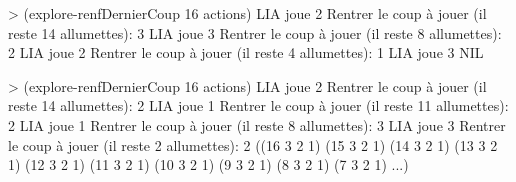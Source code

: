 \documentclass[
]{article}
\newenvironment{Shaded}{}{}
\newcommand{\DecValTok}[1]{\textcolor[rgb]{0.25,0.63,0.44}{#1}}
\newcommand{\NormalTok}[1]{#1}
\newcommand{\OperatorTok}[1]{\textcolor[rgb]{0.40,0.40,0.40}{#1}}
\begin{document}
\begin{Shaded}
    \begin{algorithm}[H]
\begin{Highlighting}[]
\OperatorTok{\textgreater{}}\NormalTok{ (explore{-}renfDernierCoup }\DecValTok{16}\NormalTok{ actions)}
\NormalTok{L\textquotesingle{}IA joue }\DecValTok{2} 
\NormalTok{Rentrer le coup à jouer (il reste }\DecValTok{14}\NormalTok{ allumettes): }
\DecValTok{3}
\NormalTok{L\textquotesingle{}IA joue }\DecValTok{3} 
\NormalTok{Rentrer le coup à jouer (il reste }\DecValTok{8}\NormalTok{ allumettes): }
\DecValTok{2}
\NormalTok{L\textquotesingle{}IA joue }\DecValTok{2} 
\NormalTok{Rentrer le coup à jouer (il reste }\DecValTok{4}\NormalTok{ allumettes): }
\DecValTok{1}
\NormalTok{L\textquotesingle{}IA joue }\DecValTok{3} 
\NormalTok{NIL}
\end{Highlighting}
\end{algorithm}
\end{Shaded}


\begin{Shaded}
    \begin{algorithm}[H]
    \begin{Highlighting}[]
\OperatorTok{\textgreater{}}\NormalTok{ (explore{-}renfDernierCoup }\DecValTok{16}\NormalTok{ actions)}
\NormalTok{L\textquotesingle{}IA joue }\DecValTok{2} 
\NormalTok{Rentrer le coup à jouer (il reste }\DecValTok{14}\NormalTok{ allumettes): }
\DecValTok{2}
\NormalTok{L\textquotesingle{}IA joue }\DecValTok{1} 
\NormalTok{Rentrer le coup à jouer (il reste }\DecValTok{11}\NormalTok{ allumettes): }
\DecValTok{2}
\NormalTok{L\textquotesingle{}IA joue }\DecValTok{1} 
\NormalTok{Rentrer le coup à jouer (il reste }\DecValTok{8}\NormalTok{ allumettes): }
\DecValTok{3}
\NormalTok{L\textquotesingle{}IA joue }\DecValTok{3} 
\NormalTok{Rentrer le coup à jouer (il reste }\DecValTok{2}\NormalTok{ allumettes): }
\DecValTok{2}
\NormalTok{((}\DecValTok{16} \DecValTok{3} \DecValTok{2} \DecValTok{1}\NormalTok{) (}\DecValTok{15} \DecValTok{3} \DecValTok{2} \DecValTok{1}\NormalTok{) (}\DecValTok{14} \DecValTok{3} \DecValTok{2} \DecValTok{1}\NormalTok{) (}\DecValTok{13} \DecValTok{3} \DecValTok{2} \DecValTok{1}\NormalTok{) (}\DecValTok{12} \DecValTok{3} \DecValTok{2} \DecValTok{1}\NormalTok{)}
\NormalTok{ (}\DecValTok{11} \DecValTok{3} \DecValTok{2} \DecValTok{1}\NormalTok{) (}\DecValTok{10} \DecValTok{3} \DecValTok{2} \DecValTok{1}\NormalTok{) (}\DecValTok{9} \DecValTok{3} \DecValTok{2} \DecValTok{1}\NormalTok{) (}\DecValTok{8} \DecValTok{3} \DecValTok{2} \DecValTok{1}\NormalTok{) (}\DecValTok{7} \DecValTok{3} \DecValTok{2} \DecValTok{1}\NormalTok{) ...)}
\end{Highlighting}
\end{algorithm}
\end{Shaded}
\end{document}
